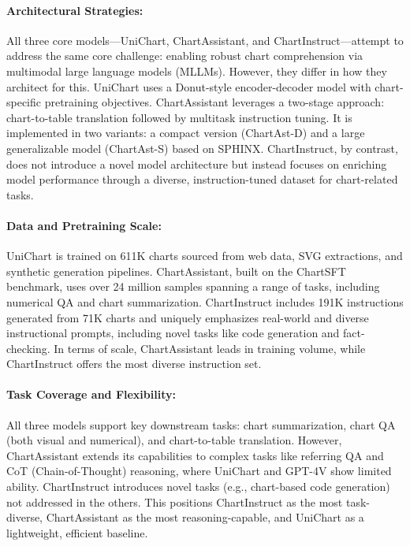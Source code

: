 \documentclass[11pt]{article}
\begin{document}
\paragraph{Architectural Strategies:}
All three core models—UniChart, ChartAssistant, and ChartInstruct—attempt to address the same core challenge: enabling robust chart comprehension via multimodal large language models (MLLMs). However, they differ in how they architect for this. UniChart uses a Donut-style encoder-decoder model with chart-specific pretraining objectives. ChartAssistant leverages a two-stage approach: chart-to-table translation followed by multitask instruction tuning. It is implemented in two variants: a compact version (ChartAst-D) and a large generalizable model (ChartAst-S) based on SPHINX. ChartInstruct, by contrast, does not introduce a novel model architecture but instead focuses on enriching model performance through a diverse, instruction-tuned dataset for chart-related tasks.

\paragraph{Data and Pretraining Scale:}
UniChart is trained on 611K charts sourced from web data, SVG extractions, and synthetic generation pipelines. ChartAssistant, built on the ChartSFT benchmark, uses over 24 million samples spanning a range of tasks, including numerical QA and chart summarization. ChartInstruct includes 191K instructions generated from 71K charts and uniquely emphasizes real-world and diverse instructional prompts, including novel tasks like code generation and fact-checking. In terms of scale, ChartAssistant leads in training volume, while ChartInstruct offers the most diverse instruction set.

\paragraph{Task Coverage and Flexibility:}
All three models support key downstream tasks: chart summarization, chart QA (both visual and numerical), and chart-to-table translation. However, ChartAssistant extends its capabilities to complex tasks like referring QA and CoT (Chain-of-Thought) reasoning, where UniChart and GPT-4V show limited ability. ChartInstruct introduces novel tasks (e.g., chart-based code generation) not addressed in the others. This positions ChartInstruct as the most task-diverse, ChartAssistant as the most reasoning-capable, and UniChart as a lightweight, efficient baseline.
\end{document}
